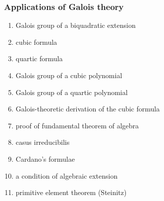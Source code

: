\documentclass[12pt]{article}
\begin{document}
\subsubsection*{Applications of Galois theory}
\begin{enumerate}
\item Galois group of a biquadratic extension
\item cubic formula
\item quartic formula
\item Galois group of a cubic polynomial
\item Galois group of a quartic polynomial
\item Galois-theoretic derivation of the cubic formula
\item proof of fundamental theorem of algebra
\item casus irreducibilis
\item Cardano's formulae 
\item a condition of algebraic extension
\item primitive element theorem (Steinitz)
\end{enumerate}

\end{document}
